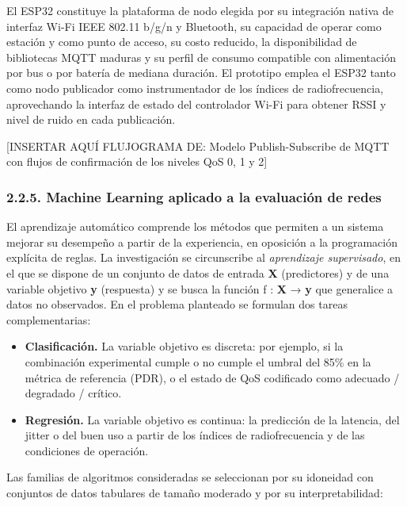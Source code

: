 \documentclass[
  12pt,
]{article}
\providecommand{\tightlist}{%
  \setlength{\itemsep}{0pt}\setlength{\parskip}{0pt}}
\begin{document}
El ESP32 constituye la plataforma de nodo elegida por su integración
nativa de interfaz Wi-Fi IEEE 802.11 b/g/n y Bluetooth, su capacidad de
operar como estación y como punto de acceso, su costo reducido, la
disponibilidad de bibliotecas MQTT maduras y su perfil de consumo
compatible con alimentación por bus o por batería de mediana duración.
El prototipo emplea el ESP32 tanto como nodo publicador como
instrumentador de los índices de radiofrecuencia, aprovechando la
interfaz de estado del controlador Wi-Fi para obtener RSSI y nivel de
ruido en cada publicación.

{[}INSERTAR AQUÍ FLUJOGRAMA DE: Modelo Publish-Subscribe de MQTT con
flujos de confirmación de los niveles QoS 0, 1 y 2{]}

\subsubsection{2.2.5. Machine Learning aplicado a la evaluación de
redes}\label{machine-learning-aplicado-a-la-evaluaciuxf3n-de-redes}

El aprendizaje automático comprende los métodos que permiten a un
sistema mejorar su desempeño a partir de la experiencia, en oposición a
la programación explícita de reglas. La investigación se circunscribe al
\emph{aprendizaje supervisado}, en el que se dispone de un conjunto de
datos de entrada \textbf{X} (predictores) y de una variable objetivo
\textbf{y} (respuesta) y se busca la función f : \textbf{X} → \textbf{y}
que generalice a datos no observados. En el problema planteado se
formulan dos tareas complementarias:

\begin{itemize}
\tightlist
\item
  \textbf{Clasificación.} La variable objetivo es discreta: por ejemplo,
  si la combinación experimental cumple o no cumple el umbral del 85\%
  en la métrica de referencia (PDR), o el estado de QoS codificado como
  adecuado / degradado / crítico.
\item
  \textbf{Regresión.} La variable objetivo es continua: la predicción de
  la latencia, del jitter o del buen uso a partir de los índices de
  radiofrecuencia y de las condiciones de operación.
\end{itemize}

Las familias de algoritmos consideradas se seleccionan por su idoneidad
con conjuntos de datos tabulares de tamaño moderado y por su
interpretabilidad:
\end{document}
